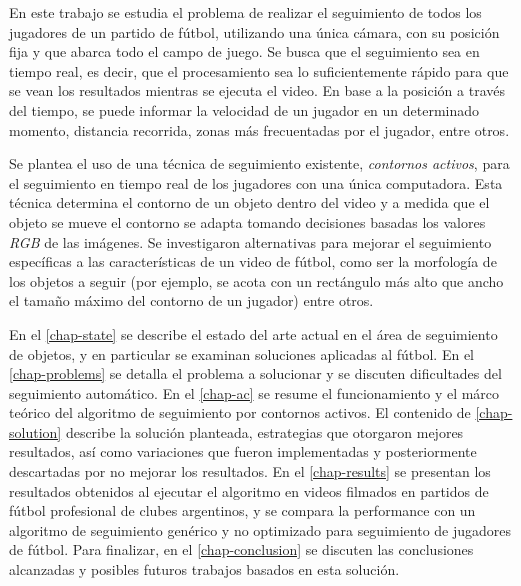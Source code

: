 \documentclass[a4paper,11pt]{report}
\begin{document}
En este trabajo se estudia el problema de realizar el seguimiento de todos los
jugadores de un partido de fútbol, utilizando una única cámara, con su posición
fija y que abarca todo el campo de juego. Se busca que el seguimiento sea en
tiempo real, es decir, que el procesamiento sea lo suficientemente rápido para
que se vean los resultados mientras se ejecuta el video. En base a la posición
a través del tiempo, se puede informar la velocidad de un jugador en un
determinado momento, distancia recorrida, zonas más frecuentadas por el
jugador, entre otros.

Se plantea el uso de una técnica de seguimiento existente, \textit{contornos
activos}, para el seguimiento en tiempo real de los jugadores con una única
computadora. Esta técnica determina el contorno de un objeto dentro del video y
a medida que el objeto se mueve el contorno se adapta tomando decisiones
basadas los valores \textit{RGB} de las imágenes. Se investigaron alternativas
para mejorar el seguimiento específicas a las características de un video de
fútbol, como ser la morfología de los objetos a seguir (por ejemplo, se acota
con un rectángulo más alto que ancho el tamaño máximo del contorno de un
jugador) entre otros.

En el \ref{chap-state} se describe el estado del arte actual en el área de
seguimiento de objetos, y en particular se examinan soluciones aplicadas al
fútbol. En el \ref{chap-problems} se detalla el problema a solucionar y se
discuten dificultades del seguimiento automático. En el \ref{chap-ac} se resume
el funcionamiento y el márco teórico del algoritmo de seguimiento por contornos
activos. El contenido de \ref{chap-solution} describe la solución planteada,
estrategias que otorgaron mejores resultados, así como variaciones que fueron
implementadas y posteriormente descartadas por no mejorar los resultados.  En
el \ref{chap-results} se presentan los resultados obtenidos al ejecutar el
algoritmo en videos filmados en partidos de fútbol profesional de clubes
argentinos, y se compara la performance con un algoritmo de seguimiento
genérico y no optimizado para seguimiento de jugadores de fútbol.
Para finalizar, en el \ref{chap-conclusion} se discuten las conclusiones
alcanzadas y posibles futuros trabajos basados en esta solución.

\newpage



\newpage


\end{document}
